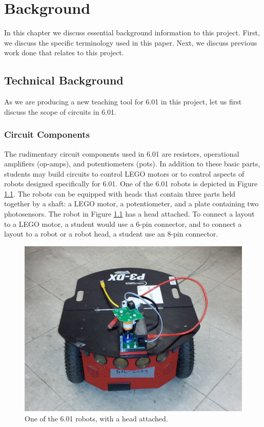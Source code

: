 
\chapter{Background}
\label{ch:background}

In this chapter we discuss essential background information to this project.
First, we discuss the specific terminology used in this paper. Next, we discuss
previous work done that relates to this project.

\section{Technical Background}

As we are producing a new teaching tool for 6.01 in this project,
let us first discuss the scope of circuits in 6.01.

\subsection{Circuit Components}

The rudimentary circuit components used in 6.01 are resistors, operational
amplifiers (op-amps), and potentiometers (pots). In addition to these basic
parts, students may build circuits to control LEGO motors or to control
aspects of robots designed specifically for 6.01. One of the 6.01 robots is
depicted in Figure \ref{fig:robot}. The robots can be equipped with heads that
contain three parts held together by a shaft: a LEGO motor, a potentiometer, and
a plate containing two photosensors. The robot in Figure \ref{fig:robot} has a
head attached. To connect a layout to a LEGO motor, a student would use a 6-pin
connector, and to connect a layout to a robot or a robot head, a student
use an 8-pin connector.

\begin{figure}
\begin{center}
\includegraphics[width=\textwidth]{Images/robot.jpeg}
\caption[6.01 robot]{One of the 6.01 robots, with a head attached.}
\label{fig:robot}
\end{center}
\end{figure}

